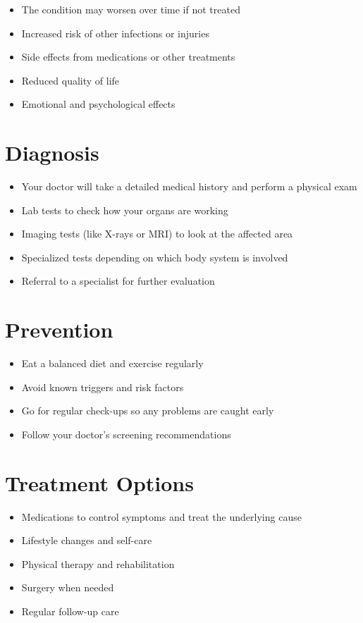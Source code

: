 \begin{itemize}[noitemsep]
  \item The condition may worsen over time if not treated
  \item Increased risk of other infections or injuries
  \item Side effects from medications or other treatments
  \item Reduced quality of life
  \item Emotional and psychological effects
\end{itemize}

\section{Diagnosis}

\begin{itemize}[noitemsep]
  \item Your doctor will take a detailed medical history and perform a physical exam
  \item Lab tests to check how your organs are working
  \item Imaging tests (like X-rays or MRI) to look at the affected area
  \item Specialized tests depending on which body system is involved
  \item Referral to a specialist for further evaluation
\end{itemize}

\section{Prevention}

\begin{itemize}[noitemsep]
  \item Eat a balanced diet and exercise regularly
  \item Avoid known triggers and risk factors
  \item Go for regular check-ups so any problems are caught early
  \item Follow your doctor's screening recommendations
\end{itemize}

\section{Treatment Options}

\begin{itemize}[noitemsep]
  \item Medications to control symptoms and treat the underlying cause
  \item Lifestyle changes and self-care
  \item Physical therapy and rehabilitation
  \item Surgery when needed
  \item Regular follow-up care
\end{itemize}

